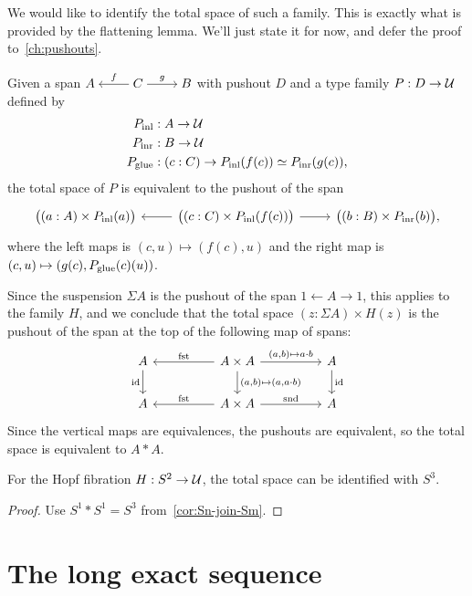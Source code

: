 \documentclass[10pt,oneside,leqno,openright]{memoir}
\begin{document}
We would like to identify the total space of such a family. This is exactly what is provided by the flattening lemma. We'll just state it for now, and defer the proof to~\cref{ch:pushouts}.
\begin{lemma}
  Given a span $\begin{tikzcd}[cramped]
    A & C\ar[l,"f"']\ar[r,"g"] & B
  \end{tikzcd}$ with pushout $D$ and a type family $P : D \to \mathcal{U}$ defined by
  \begin{align*}
    P_{\operatorname{inl}} &: A \to \mathcal{U} \\
    P_{\operatorname{inr}} &: B \to \mathcal{U} \\
    P_{\operatorname{glue}} &: (c:C) \to P_{\operatorname{inl}}(f(c)) \simeq P_{\operatorname{inr}}(g(c)),
  \end{align*}
  the total space of $P$ is equivalent to the pushout of the span
  \[
    \begin{tikzcd}
      \bigl((a:A)\times P_{\inl}(a)\bigr) &
      \bigl((c:C)\times P_{\inl}(f(c))\bigr) \ar[l]\ar[r] &
      \bigl((b:B)\times P_{\inr}(b)\bigr),
    \end{tikzcd}
  \]
  where the left maps is $(c,u)\mapsto(f(c),u)$ and the right map is
  $(c,u)\mapsto(g(c),P_{\operatorname{glue}}(c)(u))$.
\end{lemma}

Since the suspension $\Sigma A$ is the pushout of the span $1 \leftarrow A \to 1$,
this applies to the family $H$, and we conclude that the total space $(z:\Sigma A)\times H(z)$
is the pushout of the span at the top of the following map of spans:
\[
  \begin{tikzcd}[column sep=huge]
    A\ar[d,"\id"'] & A \times A\ar[l,"\fst"'] \ar[r,"{(a,b)\mapsto a\cdot b}"]
    \ar[d,"{(a,b)\mapsto (a,a\cdot b)}"] & A\ar[d,"\id"] \\
    A & A\times A\ar[l,"\fst"']\ar[r,"\snd"] & A
  \end{tikzcd}
\]
Since the vertical maps are equivalences, the pushouts are equivalent, so the total space is equivalent to $A*A$.
\begin{corollary}
  For the Hopf fibration $H: S^2 \to \mathcal{U}$, the total space can be identified with $S^3$.
\end{corollary}
\begin{proof}
  Use $S^1*S^1 = S^3$ from~\cref{cor:Sn-join-Sm}.
\end{proof}

\section{The long exact sequence}
\end{document}
